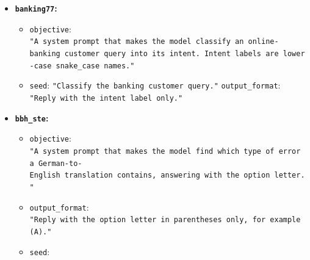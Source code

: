\documentclass[10pt]{article}
\providecommand{\tightlist}{%
  \setlength{\itemsep}{0pt}\setlength{\parskip}{0pt}}
\begin{document}
\begin{itemize}
  \begin{itemize}
  \tightlist
  \item
    \texttt{objective}:
    \texttt{"A\ system\ prompt\ that\ makes\ the\ model\ decide\ whether\ sentence\ 2\ is\ entailed\ by\ sentence\ 1\ (answer\ entailment)\ or\ not\ (answer\ neutral)."}
  \item
    \texttt{seed}:
    \texttt{"Decide\ whether\ sentence\ 2\ follows\ from\ sentence\ 1."}
    \textbar{} \texttt{output\_format}:
    \texttt{"Reply\ with\ entailment\ or\ neutral\ only."}
  \end{itemize}
\item
  \textbf{\texttt{banking77}:}

  \begin{itemize}
  \tightlist
  \item
    \texttt{objective}:
    \texttt{"A\ system\ prompt\ that\ makes\ the\ model\ classify\ an\ online-banking\ customer\ query\ into\ its\ intent.\ Intent\ labels\ are\ lower-case\ snake\_case\ names."}
  \item
    \texttt{seed}: \texttt{"Classify\ the\ banking\ customer\ query."}
    \textbar{} \texttt{output\_format}:
    \texttt{"Reply\ with\ the\ intent\ label\ only."}
  \end{itemize}
\item
  \textbf{\texttt{bbh\_ste}:}

  \begin{itemize}
  \item
    \texttt{objective}:
    \texttt{"A\ system\ prompt\ that\ makes\ the\ model\ find\ which\ type\ of\ error\ a\ German-to-English\ translation\ contains,\ answering\ with\ the\ option\ letter."}
  \item
    \texttt{output\_format}:
    \texttt{"Reply\ with\ the\ option\ letter\ in\ parentheses\ only,\ for\ example\ (A)."}
  \item
    \texttt{seed}:


\end{itemize}
\end{itemize}
\end{document}
